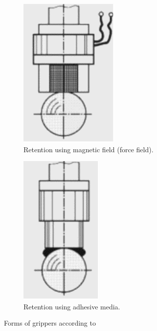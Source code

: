 \begin{figure}[h!]
{\begin{tcolorbox}
\begin{subfigure}[c]{0.25\textwidth}
         \label{fig:g4}
     \end{subfigure}
     \qquad
     \begin{subfigure}[c]{0.25\textwidth}
         \centering
         \includegraphics[width=.5\textwidth]{Apendices/Figuras/g5_gray_bg.pdf}
         \caption{Retention using magnetic field (force field).}
         \label{fig:g5}
     \end{subfigure}
     \qquad
     \begin{subfigure}[c]{0.25\textwidth}
         \centering
         \includegraphics[width=.5\textwidth]{Apendices/Figuras/g6_gray_bg.pdf}
         \caption{Retention using adhesive media.}
         \label{fig:g6}
     \end{subfigure}
    \end{tcolorbox}
    \caption{Forms of grippers according to \cite{monkman2007robot}}
    \label{fig:most_usual_gripper_forms}
  }%
\end{figure}


